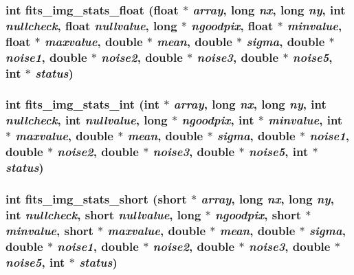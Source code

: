 \subsubsection{\setlength{\rightskip}{0pt plus 5cm}int fits\_\-img\_\-stats\_\-float (float $\ast$ {\em array}, long {\em nx}, long {\em ny}, int {\em nullcheck}, float {\em nullvalue}, long $\ast$ {\em ngoodpix}, float $\ast$ {\em minvalue}, float $\ast$ {\em maxvalue}, double $\ast$ {\em mean}, double $\ast$ {\em sigma}, double $\ast$ {\em noise1}, double $\ast$ {\em noise2}, double $\ast$ {\em noise3}, double $\ast$ {\em noise5}, int $\ast$ {\em status})}\label{fitsio__64_8h_363e65c6f636ef3cf8ef07f4373b2632}


\subsubsection{\setlength{\rightskip}{0pt plus 5cm}int fits\_\-img\_\-stats\_\-int (int $\ast$ {\em array}, long {\em nx}, long {\em ny}, int {\em nullcheck}, int {\em nullvalue}, long $\ast$ {\em ngoodpix}, int $\ast$ {\em minvalue}, int $\ast$ {\em maxvalue}, double $\ast$ {\em mean}, double $\ast$ {\em sigma}, double $\ast$ {\em noise1}, double $\ast$ {\em noise2}, double $\ast$ {\em noise3}, double $\ast$ {\em noise5}, int $\ast$ {\em status})}\label{fitsio__64_8h_17a29b97bdc38cf200845b69db751b23}


\subsubsection{\setlength{\rightskip}{0pt plus 5cm}int fits\_\-img\_\-stats\_\-short (short $\ast$ {\em array}, long {\em nx}, long {\em ny}, int {\em nullcheck}, short {\em nullvalue}, long $\ast$ {\em ngoodpix}, short $\ast$ {\em minvalue}, short $\ast$ {\em maxvalue}, double $\ast$ {\em mean}, double $\ast$ {\em sigma}, double $\ast$ {\em noise1}, double $\ast$ {\em noise2}, double $\ast$ {\em noise3}, double $\ast$ {\em noise5}, int $\ast$ {\em status})}\label{fitsio__64_8h_4b65735a933159172b97311d4b1b48b6}


